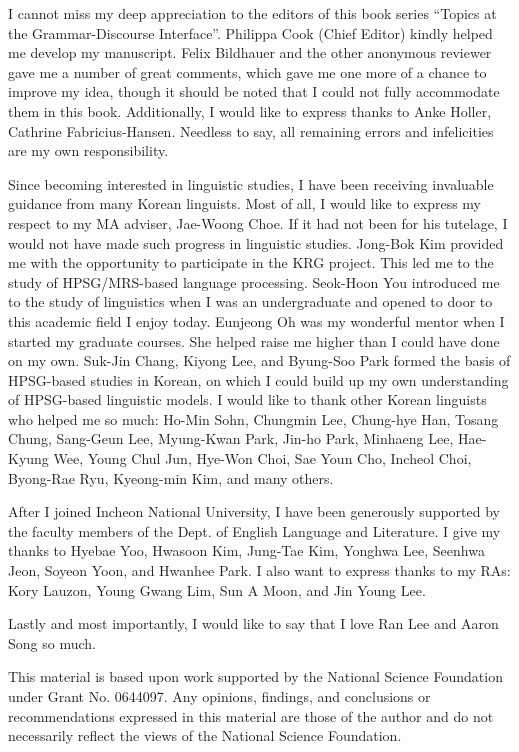 \begin{refsection}
I cannot miss my deep appreciation to the editors of this book series
``Topics at the Grammar-Discourse Interface''. Philippa Cook (Chief
Editor) kindly helped me develop my manuscript. Felix Bildhauer and
the other anonymous reviewer gave me a number of great comments, which gave
me one more of a chance to improve my idea, though it should be noted
that I could not fully accommodate them in this book. Additionally, I
would like to express thanks to Anke Holler, Cathrine
Fabricius-Hansen. Needless to say, all remaining errors and
infelicities are my own responsibility.



Since becoming interested in linguistic studies, I have been receiving
invaluable guidance from many Korean linguists. Most of all, I would
like to express my respect to my MA adviser, Jae-Woong Choe. If it had
not been for his tutelage, I would not have made such progress in
linguistic studies. Jong-Bok Kim provided me with the opportunity to
participate in the KRG project. This led me to the study of
HPSG/MRS-based language processing. Seok-Hoon You introduced me to the
study of linguistics when I was an undergraduate and opened to door to
this academic field I enjoy today. Eunjeong Oh was my wonderful mentor
when I started my graduate courses. She helped raise me higher than I
could have done on my own. Suk-Jin Chang, Kiyong Lee, and Byung-Soo
Park formed the basis of HPSG-based studies in Korean, on which I
could build up my own understanding of HPSG-based linguistic
models. I would like to thank other Korean linguists who helped me so
much: Ho-Min Sohn, Chungmin Lee, Chung-hye Han, Tosang Chung, 
Sang-Geun Lee, Myung-Kwan Park, Jin-ho Park, Minhaeng Lee, 
Hae-Kyung Wee, Young Chul Jun, Hye-Won Choi, Sae Youn Cho, Incheol Choi, 
Byong-Rae Ryu, Kyeong-min Kim, and many others.



After I joined Incheon National University, I have been generously
supported by the faculty members of the Dept. of English Language and
Literature. I give my thanks to Hyebae Yoo, Hwasoon Kim, Jung-Tae Kim,
Yonghwa Lee, Seenhwa Jeon, Soyeon Yoon, and Hwanhee Park.
I also want to express thanks to my RAs: Kory Lauzon, 
Young Gwang Lim, Sun A Moon, and Jin Young Lee.



Lastly and most importantly, I would like to say that I love Ran Lee
and Aaron Song so much.


This material is based upon work supported by the National Science
Foundation under Grant No. 0644097. Any opinions, findings, and
conclusions or recommendations expressed in this material are those of
the author and do not necessarily reflect the views of the National
Science Foundation.



\printbibliography[heading=subbibliography]
\end{refsection}

